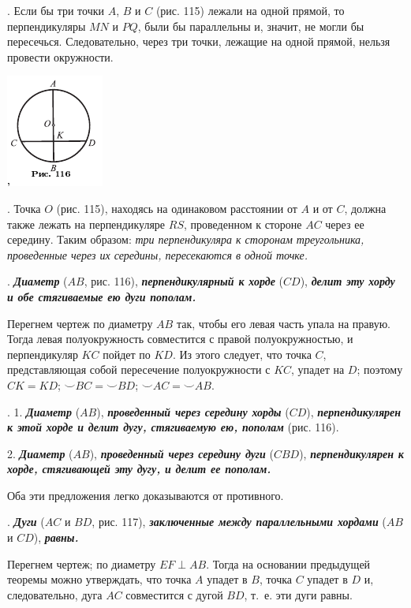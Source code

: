 \documentclass[oneside]{book}
\begin{document}
.
Если бы три точки $A$, $B$ и $C$ (рис. 115) лежали на одной прямой, то перпендикуляры $MN$ и $PQ$, были бы параллельны и, значит, не могли бы пересечься.
Следовательно, через три точки, лежащие на одной прямой, нельзя провести окружности.

\includegraphics{pics/ris-116}

.
Точка $O$ (рис. 115), находясь на одинаковом расстоянии от $A$ и от $C$, должна также лежать на перпендикуляре $RS$, проведенном к стороне $AC$ через ее середину.
Таким образом:
\emph{три перпендикуляра к сторонам треугольника, проведенные через их середины, пересекаются в одной точке.}

.
\textbf{\emph{Диаметр}} ($AB$, рис. 116), \textbf{\emph{перпендикулярный к хорде}} ($CD$), \textbf{\emph{делит эту хорду и обе стягиваемые ею дуги пополам.}}

Перегнем чертеж по диаметру $AB$ так, чтобы его левая часть упала на правую.
Тогда левая полуокружность совместится с правой полуокружностью, и перпендикуляр $KC$ пойдет по $KD$.
Из этого следует, что точка $C$, представляющая собой пересечение полуокружности с $KC$, упадет на $D$;
поэтому $CK=KD$;
${\smallsmile} BC={\smallsmile} BD$;
${\smallsmile} AC={\smallsmile} AB$.

.
1.
\textbf{\emph{Диаметр}} ($AB$), \textbf{\emph{проведенный через середину хорды}} ($CD$), \textbf{\emph{перпендикулярен к этой хорде и делит дугу, стягиваемую ею, пополам}} (рис. 116).

2.
\textbf{\emph{Диаметр}} ($AB$), \textbf{\emph{проведенный через середину дуги}} ($CBD$), \textbf{\emph{перпендикулярен к хорде, стягивающей эту дугу, и делит ее пополам.}}

Оба эти предложения легко доказываются от противного.

.
\textbf{\emph{Дуги}} ($AC$ и $BD$, рис. 117), \textbf{\emph{заключенные между параллельными хордами}} ($AB$ и $CD$), \textbf{\emph{равны.}}

Перегнем чертеж;
по диаметру $EF\perp AB$.
Тогда на основании предыдущей теоремы можно утверждать, что точка $A$ упадет в $B$, точка $C$ упадет в $D$ и, следовательно, дуга $AC$ совместится с дугой $BD$, т.~е. эти дуги равны.
\end{document}
